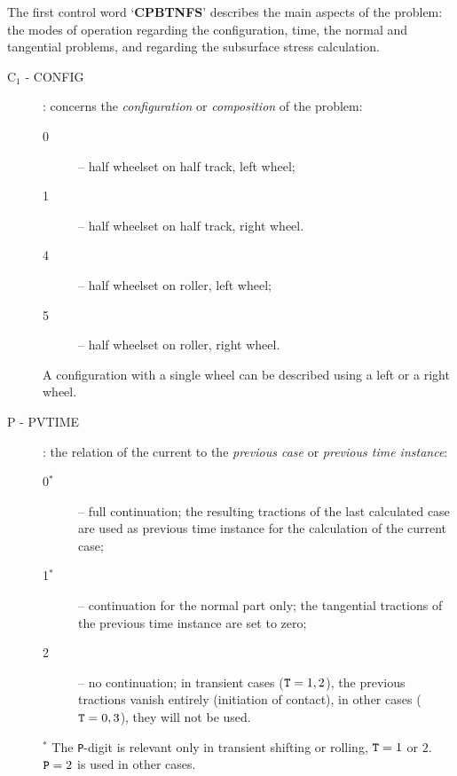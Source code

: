 \documentclass[12pt]{report}
\renewcommand{\magenta}[1]{}
\begin{document}
The first control word `{\bf CPBTNFS}' describes the main aspects of the
problem: the modes of operation regarding the configuration, time, the
normal and tangential problems, and regarding the subsurface stress
calculation.
\begin{description}
\item[C$_1$ - CONFIG] \label{c1-digit} : concerns the {\em 
        configuration\/} or {\em composition\/} of the problem:
\begin{description}
\item[0] -- half wheelset on half track, left wheel;
\item[1] -- half wheelset on half track, right wheel.
\item[4] -- half wheelset on roller, left wheel;
\item[5] -- half wheelset on roller, right wheel.
\end{description}
A configuration with a single wheel can be described using a left or a right
wheel.

\item[P - PVTIME]\label{p-digit} : the relation of the current to the
        {\em previous case\/} or {\em previous time instance\/}:
\begin{description}
\item[0$^*$] -- full continuation; the resulting tractions of the last
                calculated case are used as previous time instance for the
                calculation of the current case;
\item[1$^*$] -- continuation for the normal part only; the tangential
                tractions of the previous time instance are set to zero;
\item[2] -- no continuation; in transient cases (${\tt T}=1, 2$), the
        previous tractions vanish entirely (initiation of contact), in
        other cases (${\tt T}=0, 3$), they will not be used.
\magenta{
\item[3] -- leave previous tractions untouched. Used internally in the
        program to avoid copying in the total-force iteration.
}
\end{description}
$^*$ The {\tt P}-digit is relevant only in transient shifting or rolling,
${\tt T}=1$ or $2$. ${\tt P}=2$ is used in other cases.


\end{description}
\end{document}

